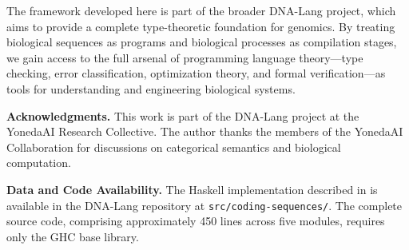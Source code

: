 \documentclass[12pt,a4paper]{article}
\theoremstyle{definition}
\begin{document}
The framework developed here is part of the broader DNA-Lang project, which aims to provide a complete type-theoretic foundation for genomics.
By treating biological sequences as programs and biological processes as compilation stages, we gain access to the full arsenal of programming language theory---type checking, error classification, optimization theory, and formal verification---as tools for understanding and engineering biological systems.

\vspace{1cm}
\noindent\textbf{Acknowledgments.}
This work is part of the DNA-Lang project at the YonedaAI Research Collective.
The author thanks the members of the YonedaAI Collaboration for discussions on categorical semantics and biological computation.

\vspace{0.5cm}
\noindent\textbf{Data and Code Availability.}
The Haskell implementation described in  is available in the DNA-Lang repository at \texttt{src/coding-sequences/}. The complete source code, comprising approximately 450 lines across five modules, requires only the GHC base library.
\end{document}
